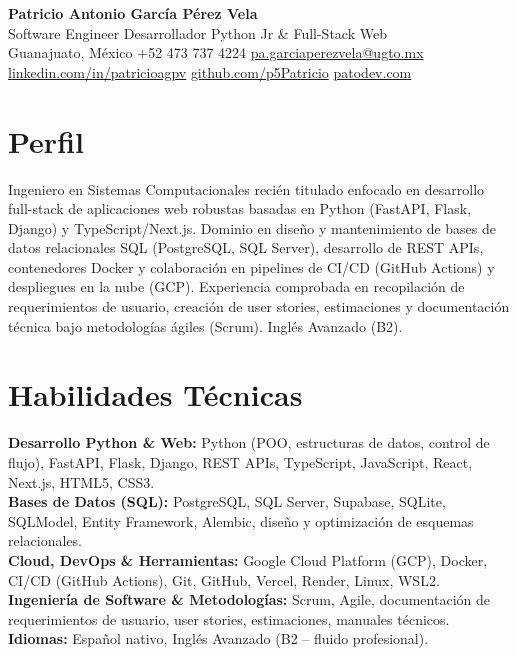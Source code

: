 \documentclass[10pt,letterpaper]{article}
\begin{document}
\pagestyle{empty}
\sffamily

\begin{center}
  {\LARGE\bfseries\color{headingcolor} Patricio Antonio García Pérez Vela}\\[0.18em]
  {\small Software Engineer \textbar{} Desarrollador Python Jr \& Full-Stack Web}\\[0.28em]
  {\footnotesize Guanajuato, México \textbar{} +52 473 737 4224 \textbar{} \href{mailto:pa.garciaperezvela@ugto.mx}{pa.garciaperezvela@ugto.mx}}\\[0.12em]
  {\footnotesize \href{https://linkedin.com/in/patricioagpv}{linkedin.com/in/patricioagpv} \textbar{} \href{https://github.com/p5Patricio}{github.com/p5Patricio} \textbar{} \href{https://patodev.com/}{patodev.com}}
\end{center}

\vspace{0.05em}

\section{Perfil}
{\small Ingeniero en Sistemas Computacionales recién titulado enfocado en desarrollo full-stack de aplicaciones web robustas basadas en Python (FastAPI, Flask, Django) y TypeScript/Next.js. Dominio en diseño y mantenimiento de bases de datos relacionales SQL (PostgreSQL, SQL Server), desarrollo de REST APIs, contenedores Docker y colaboración en pipelines de CI/CD (GitHub Actions) y despliegues en la nube (GCP). Experiencia comprobada en recopilación de requerimientos de usuario, creación de user stories, estimaciones y documentación técnica bajo metodologías ágiles (Scrum). Inglés Avanzado (B2).}

\section{Habilidades Técnicas}
{\small
\textbf{Desarrollo Python \& Web:} Python (POO, estructuras de datos, control de flujo), FastAPI, Flask, Django, REST APIs, TypeScript, JavaScript, React, Next.js, HTML5, CSS3.\\[0.04em]
\textbf{Bases de Datos (SQL):} PostgreSQL, SQL Server, Supabase, SQLite, SQLModel, Entity Framework, Alembic, diseño y optimización de esquemas relacionales.\\[0.04em]
\textbf{Cloud, DevOps \& Herramientas:} Google Cloud Platform (GCP), Docker, CI/CD (GitHub Actions), Git, GitHub, Vercel, Render, Linux, WSL2.\\[0.04em]
\textbf{Ingeniería de Software \& Metodologías:} Scrum, Agile, documentación de requerimientos de usuario, user stories, estimaciones, manuales técnicos.\\[0.04em]
\textbf{Idiomas:} Español nativo, Inglés Avanzado (B2 -- fluido profesional).
}
\end{document}

